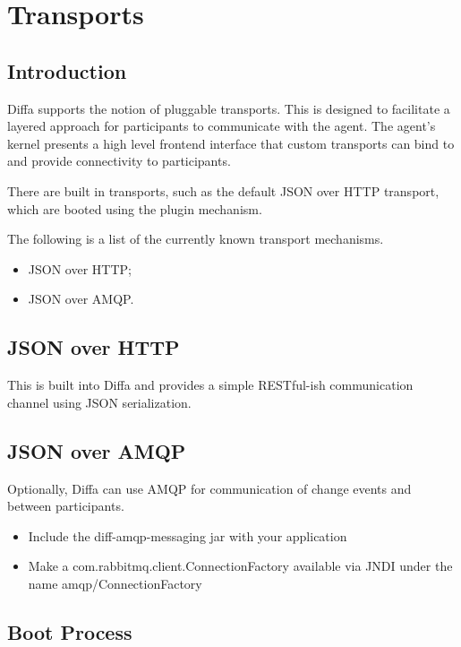 \chapter{Transports}

\section{Introduction}

Diffa supports the notion of pluggable transports. This is designed to facilitate a layered approach for participants to communicate with the agent. The agent's kernel presents a high level frontend interface that custom transports can bind to and provide connectivity to participants.

There are built in transports, such as the default JSON over HTTP transport, which are booted using the plugin mechanism.

The following is a list of the currently known transport mechanisms.

\begin{itemize}
	\item JSON over HTTP;
	\item JSON over AMQP.
\end{itemize}

\section{JSON over HTTP}

This is built into Diffa and provides a simple RESTful-ish communication channel using JSON serialization.

\section{JSON over AMQP}

Optionally, Diffa can use AMQP for communication of change events and between participants.

\begin{itemize}
    \item Include the diff-amqp-messaging jar with your application
    \item Make a com.rabbitmq.client.ConnectionFactory available via JNDI under the name amqp/ConnectionFactory
\end{itemize}

\section{Boot Process}


